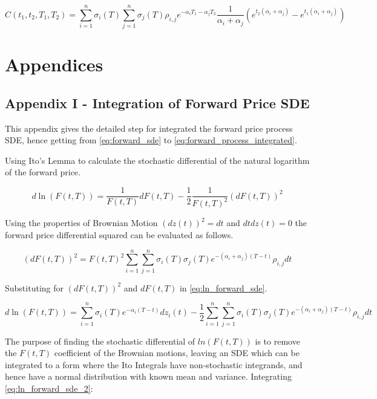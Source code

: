 \documentclass{article}
\begin{document}
\begin{equation}
    C(t_1, t_2, T_1, T_2) = \sum_{i=1}^n \sigma_i(T) \sum_{j=1}^n \sigma_j(T) \rho_{i,j} 
    e^{-\alpha_i T_1 -\alpha_j T_2} \frac{1}{\alpha_i + \alpha_j}
    (e^{t_2(\alpha_i + \alpha_j)} - e^{t_1(\alpha_i + \alpha_j)} )
\end{equation}

\section{Appendices} %
\subsection{Appendix I - Integration of Forward Price SDE}
This appendix gives the detailed step for integrated the forward price process
SDE, hence getting from \ref{eq:forward_sde} to \ref{eq:forward_process_integrated}.

\bigskip

Using Ito's Lemma to calculate the stochastic differential of the natural logarithm
of the forward price.

\begin{equation}
    \label{eq:ln_forward_sde}
    d\ln(F(t, T)) = \frac{1}{F(t, T)} dF(t, T) - \frac{1}{2}
        \frac{1}{F(t, T)^2} (dF(t, T))^2
\end{equation}

Using the properties of Brownian Motion $(dz(t))^2=dt$ and $dtdz(t)=0$ the forward
price differential squared can be evaluated as follows.

\begin{equation}
    \label{eq:df_squared}
    (dF(t, T))^2 = F(t, T)^2 \sum_{i=1}^n \sum_{j=1}^n \sigma_i(T) \sigma_j(T)
    e^{-(\alpha_i + \alpha_j)(T-t)}\rho_{i,j}dt
\end{equation}

Substituting for $(dF(t, T))^2$ and $dF(t, T)$ in \ref{eq:ln_forward_sde}.

\begin{equation}
    \label{eq:ln_forward_sde_2}
    d\ln(F(t, T)) = \sum_{i=1}^n \sigma_i(T)e^{-\alpha_i(T-t)}dz_i(t) - 
    \frac{1}{2} \sum_{i=1}^n \sum_{j=1}^n \sigma_i(T) \sigma_j(T)
    e^{-(\alpha_i + \alpha_j)(T-t)}\rho_{i,j}dt
\end{equation}

The purpose of finding the stochastic differential of $ln(F(t, T))$ is to remove the
$F(t, T)$ coefficient of the Brownian motions, leaving an SDE which can be integrated
to a form where the Ito Integrals have non-stochastic integrands, and hence have a normal
distribution with known mean and variance. Integrating \ref{eq:ln_forward_sde_2}:
\end{document}
